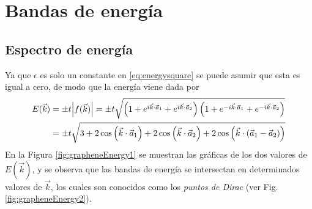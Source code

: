 \section{Bandas de energía}
\subsection{Espectro de energía}
Ya que $\epsilon$ es solo un constante en \eqref{eq:energysquare} se puede asumir que esta es igual a cero, de modo que la energía viene dada por
\begin{align}
	\nonumber E(\vec{k}) & = \pm t\abs{f(\vec{k})} = \pm t \sqrt{\left(1+e^{i \vec{k}\cdot \vec{a}_1}+e^{i \vec{k}\cdot \vec{a}_2}\right)\left(1+e^{-i \vec{k}\cdot \vec{a}_1}+e^{-i \vec{k}\cdot \vec{a}_2}\right)} \\
	                     & = \pm t \sqrt{3+2 \cos\left(\vec{k}\cdot \vec{a}_1\right)+2 \cos\left(\vec{k}\cdot \vec{a}_2\right)+2 \cos\left(\vec{k}\cdot\left(\vec{a}_1 - \vec{a}_2 \right)\right)}\label{eq:energygraphene}
\end{align}
En la Figura \ref{fig:grapheneEnergy1} se muestran las gráficas de los dos valores de $E(\vec{k})$, y se observa que las bandas de energía se intersectan en determinados valores de $\vec{k}$, los cuales son conocidos como los \emph{puntos de Dirac} (ver Fig. \ref{fig:grapheneEnergy2}).
